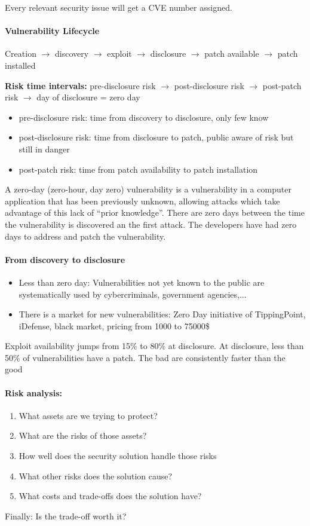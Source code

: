Every relevant security issue will get a CVE
number assigned.

\paragraph{Vulnerability Lifecycle}
Creation $\rightarrow$ discovery $\rightarrow$ exploit $\rightarrow$ disclosure $\rightarrow$ patch available $\rightarrow$ patch installed

\textbf{Risk time intervals:} pre-disclosure risk $\rightarrow$ post-disclosure risk $\rightarrow$ post-patch risk $\rightarrow$ day of disclosure = zero day

\begin{itemize}
\item pre-disclosure risk: time from discovery to disclosure, only few know
\item post-disclosure risk: time from disclosure to patch, public aware of
risk but still in danger
\item post-patch risk: time from patch availability to patch installation
\end{itemize}

 A zero-day (zero-hour, day zero) vulnerability is a vulnerability in a computer application that has been previously unknown, allowing attacks which take advantage of this lack of ``prior knowledge''. There are zero days between the time the vulnerability is discovered an the first attack. The developers have had zero days to address and patch the vulnerability.

\paragraph{From discovery to disclosure}
\begin{itemize}
\item  Less than zero day: Vulnerabilities not yet
known to the public are systematically used
by cybercriminals, government agencies,...
\item There is a market for new vulnerabilities:
Zero Day initiative of TippingPoint,
iDefense, black market, pricing from 1000
to 75000\$
\end{itemize}
Exploit availability jumps from 15\% to 80\%
at disclosure. At disclosure, less than 50\% of
vulnerabilities have a patch. The bad are
consistently faster than the good

\paragraph{Risk analysis:}
\begin{enumerate}
\item What assets are we trying to protect?
\item What are the risks of those assets?
\item How well does the security solution handle those risks
\item What other risks does the solution cause?
\item What costs and trade-offs does the
solution have?
\end{enumerate}
Finally: Is the trade-off worth it?

